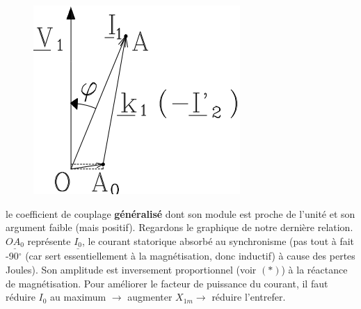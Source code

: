 						\begin{figure}
		\vspace{-8mm}
		\includegraphics[scale=0.45]{ch5/image28.png}
		\end{figure}
		le coefficient de couplage \textbf{généralisé} dont son module est proche de l'unité et 
		son argument faible (mais positif). Regardons le graphique de notre dernière relation. 
		$\underline{OA_0}$ représente $\underline{I_0}$, le courant statorique absorbé au 
		synchronisme (pas tout à fait -90$^\circ$ (car sert essentiellement à la magnétisation, 
		donc inductif) à cause des pertes Joules). Son amplitude est inversement proportionnel 
		(voir $(*)$) à la réactance de magnétisation. Pour améliorer le facteur de puissance du 
		courant, il faut réduire $I_0$ au maximum $\rightarrow$ augmenter $X_{1m} \rightarrow$ 
		réduire l'entrefer.\\
		
